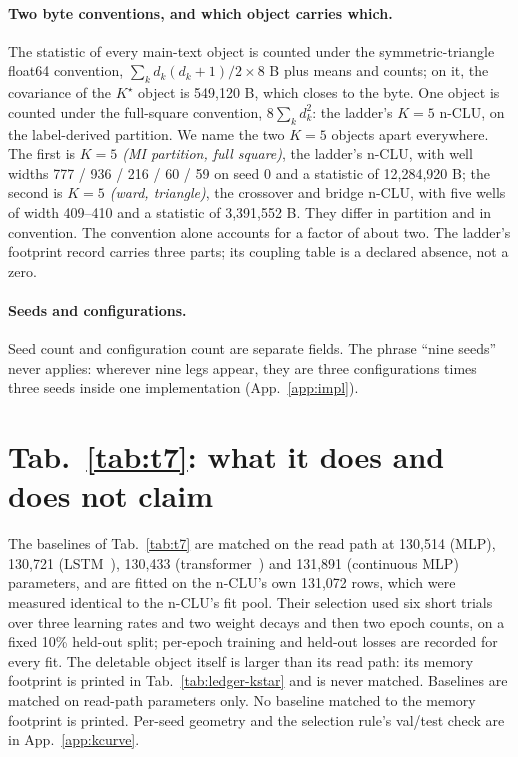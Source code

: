 \documentclass{article} %
\newcommand{\Kstar}{\ensuremath{K^{\star}}}
\begin{document}
\paragraph{Two byte conventions, and which object carries which.} The statistic of every
main-text object is counted under the symmetric-triangle float64 convention,
$\sum_k d_k(d_k+1)/2\times8$ B plus means and counts; on it, the covariance of the $\Kstar$
object is 549,120 B, which closes to the byte. %
One object is counted under the full-square convention, $8\sum_k d_k^2$: the ladder's $K=5$ n-CLU,
on the label-derived partition. We name the two $K=5$ objects apart everywhere. The first is
\emph{$K=5$ (MI partition, full square)}, the ladder's n-CLU, with well widths 777 / 936 / 216 / 60 /
59 on seed 0 and a statistic of 12,284,920 B; the second is \emph{$K=5$ (ward, triangle)}, the
crossover and bridge n-CLU, with five wells of width 409--410 and a statistic of 3,391,552 B.
They differ in partition and in convention. The convention alone accounts for a factor of about two.
The ladder's footprint record carries three parts; its coupling table is a declared absence, not a
zero. %

\paragraph{Seeds and configurations.} Seed count and configuration count are separate fields. The
phrase ``nine seeds'' never applies: wherever nine legs appear, they are three configurations
times three seeds inside one implementation (App.~\ref{app:impl}).

\section{Tab.~\ref{tab:t7}: what it does and does not claim}
\label{app:t7more}
The baselines of Tab.~\ref{tab:t7} are matched on the read path at 130,514 (MLP), 130,721 (LSTM~\citep{hochreiter_long_1997}), %
130,433 (transformer~\citep{vaswani_attention_2023}) and 131,891 (continuous MLP) parameters, and are fitted on the n-CLU's own %
131,072 rows, which were measured identical to the n-CLU's fit pool. Their selection used six short %
trials over three learning rates and two weight decays and then two epoch counts, on a fixed 10\%
held-out split; per-epoch training and held-out losses are recorded for every fit. %
The deletable object itself is larger than its read path: its memory footprint is printed
in Tab.~\ref{tab:ledger-kstar} and is never matched. Baselines are matched on read-path
parameters only. No baseline matched to the memory footprint is printed.
Per-seed geometry and the selection rule's val/test check are in App.~\ref{app:kcurve}.
\end{document}
